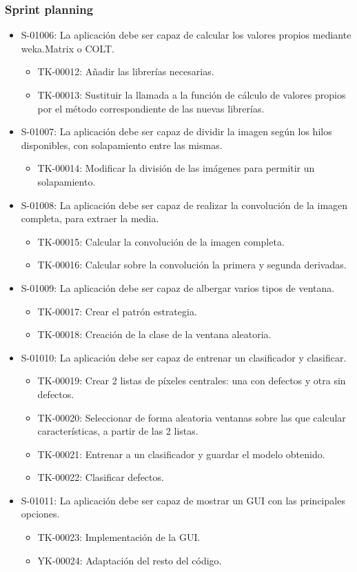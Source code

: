 \subsubsection*{Sprint planning}
\begin{itemize}
 \item S-01006: La aplicación debe ser capaz de calcular los valores propios mediante weka.Matrix o COLT.
 \begin{itemize}
  \item TK-00012: Añadir las librerías necesarias.
  \item TK-00013: Sustituir la llamada a la función de cálculo de valores propios por el método correspondiente de las nuevas librerías.
 \end{itemize}
 \item S-01007: La aplicación debe ser capaz de dividir la imagen según los hilos disponibles, con solapamiento entre las mismas.
 \begin{itemize}
  \item TK-00014: Modificar la división de las imágenes para permitir un solapamiento.
 \end{itemize}
 \item S-01008: La aplicación debe ser capaz de realizar la convolución de la imagen completa, para extraer la media.
 \begin{itemize}
  \item TK-00015: Calcular la convolución de la imagen completa.
  \item TK-00016: Calcular sobre la convolución la primera y segunda derivadas.
 \end{itemize}
 \item S-01009: La aplicación debe ser capaz de albergar varios tipos de ventana.
 \begin{itemize}
  \item TK-00017: Crear el patrón estrategia.
  \item TK-00018: Creación de la clase de la ventana aleatoria.
 \end{itemize}
 \item S-01010: La aplicación debe ser capaz de entrenar un clasificador y clasificar.
 \begin{itemize}
  \item TK-00019: Crear 2 listas de píxeles centrales: una con defectos y otra sin defectos.
  \item TK-00020: Seleccionar de forma aleatoria ventanas sobre las que calcular características, a partir de las 2 listas.
  \item TK-00021: Entrenar a un clasificador y guardar el modelo obtenido.
  \item TK-00022: Clasificar defectos.
 \end{itemize}
 \item S-01011: La aplicación debe ser capaz de mostrar un GUI con las principales opciones.
 \begin{itemize}
  \item TK-00023: Implementación de la GUI.
  \item YK-00024: Adaptación del resto del código.
 \end{itemize}
\end{itemize}

